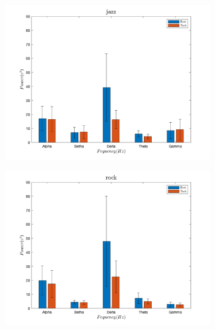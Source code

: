 \documentclass[9pt,twocolumn]{paper-template}
\begin{document}
\begin{figure}[!htbp]
  \centering
  \begin{subfigure}[b]{0.4\linewidth}
    \includegraphics[width=\linewidth]{figures/jazz_RT.png}
  \end{subfigure}
  \begin{subfigure}[b]{0.4\linewidth}
    \includegraphics[width=\linewidth]{figures/rock_RT.png}
  \end{subfigure}
   \begin{subfigure}[b]{0.4\linewidth}

\end{subfigure}
\end{figure}
\end{document}
